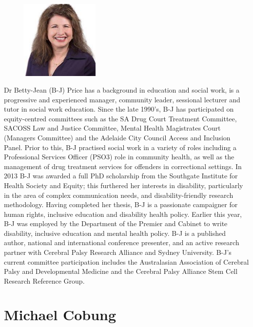 \documentclass[twoside,12pt,a4paper,notitlepage]{memoir}
\begin{document}
\begin{figure}
\centering
\includegraphics[width=0.35\textwidth]{betty_jean.jpg}
\end{figure}

Dr Betty-Jean (B-J) Price has a background in education and social work, is a progressive and experienced manager, community leader, sessional lecturer and tutor in social work education.  Since the late 1990’s, B-J has participated on equity-centred committees such as the SA Drug Court Treatment Committee, SACOSS Law and Justice Committee, Mental Health Magistrates Court (Managers Committee) and the Adelaide City Council Access and Inclusion Panel.  Prior to this, B-J practised social work in a variety of roles including a Professional Services Officer (PSO3) role in community health, as well as the management of drug treatment services for offenders in correctional settings. In 2013 B-J was awarded a full PhD scholarship from the Southgate Institute for Health Society and Equity; this furthered her interests in disability, particularly in the area of complex communication needs, and disability-friendly research methodology. Having completed her thesis, B-J is a passionate campaigner for human rights, inclusive education and disability health policy. Earlier this year, B-J was employed by the Department of the Premier and Cabinet to write disability, inclusive education and mental health policy.  B-J is a published author, national and international conference presenter, and an active research partner with Cerebral Palsy Research Alliance and Sydney University.  B-J’s current committee participation includes the Australasian Association of Cerebral Palsy and Developmental Medicine and the Cerebral Palsy Alliance Stem Cell Research Reference Group.
\vfill


\clearpage{}
\vspace*{2cm}
\section*{Michael Cobung}
\end{document}
